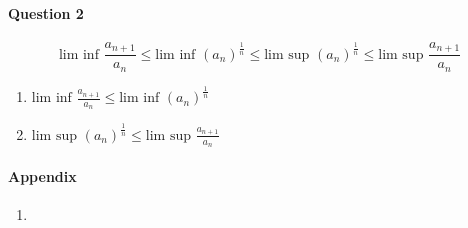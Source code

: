 \documentclass[20pt]{extarticle} %
\begin{document}
\paragraph{Question 2}
\[ \text{lim inf } \frac{a_{n+1}}{a_n} \leq \text{lim inf }(a_n)^\frac{1}{n} \leq \text{lim sup }(a_n)^\frac{1}{n} \leq \text{lim sup }\frac{a_{n+1}}{a_n} \]

\begin{enumerate}[label=\Roman*]
	\item $\text{lim inf } \frac{a_{n+1}}{a_n} \leq \text{lim inf }(a_n)^\frac{1}{n}$
	\item $\text{lim sup }(a_n)^\frac{1}{n} \leq \text{lim sup }\frac{a_{n+1}}{a_n}$
\end{enumerate}

\paragraph{Appendix}
\begin{enumerate}
	\item {}
\end{enumerate}
\end{document}
